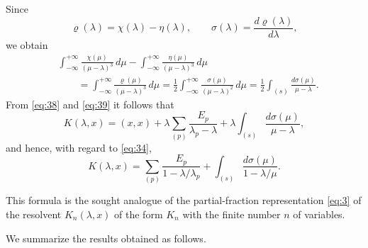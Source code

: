 \documentclass[b5paper,twoside]{article}
\newcommand{\originalpage}[1]{\phantomsection\label{origpage:#1}}
\begin{document}
Since
\[
  \varrho(\lambda)=\chi(\lambda)-\eta(\lambda),
  \qquad
  \sigma(\lambda)=\frac{d\varrho(\lambda)}{d\lambda},
\]
we obtain
\[
\begin{aligned}
  &\int_{-\infty}^{+\infty}
    \frac{\chi(\mu)}{(\mu-\lambda)^3}\,d\mu
  -\int_{-\infty}^{+\infty}
    \frac{\eta(\mu)}{(\mu-\lambda)^3}\,d\mu\\
  &\qquad=\int_{-\infty}^{+\infty}
    \frac{\varrho(\mu)}{(\mu-\lambda)^3}\,d\mu
  =\frac12\int_{-\infty}^{+\infty}
    \frac{\sigma(\mu)}{(\mu-\lambda)^2}\,d\mu
  =\frac12\int_{(s)}\frac{d\sigma(\mu)}{\mu-\lambda}.
\end{aligned}
\]
From \eqref{eq:38} and \eqref{eq:39} it follows that
\begin{equation}
\tag{40}\label{eq:40}
  K(\lambda,x)
  =(x,x)+\lambda\sum_{(p)}\frac{E_p}{\lambda_p-\lambda}
  +\lambda\int_{(s)}\frac{d\sigma(\mu)}{\mu-\lambda},
\end{equation}
\originalpage{175}and hence, with regard to \eqref{eq:34},
\[
  K(\lambda,x)
  =\sum_{(p)}\frac{E_p}{1-\lambda/\lambda_p}
  +\int_{(s)}\frac{d\sigma(\mu)}{1-\lambda/\mu}.
\]

This formula is the sought analogue of the partial-fraction representation
\eqref{eq:3} of the resolvent $K_n(\lambda,x)$ of the form $K_n$ with the
finite number $n$ of variables.

We summarize the results obtained as follows.
\end{document}
